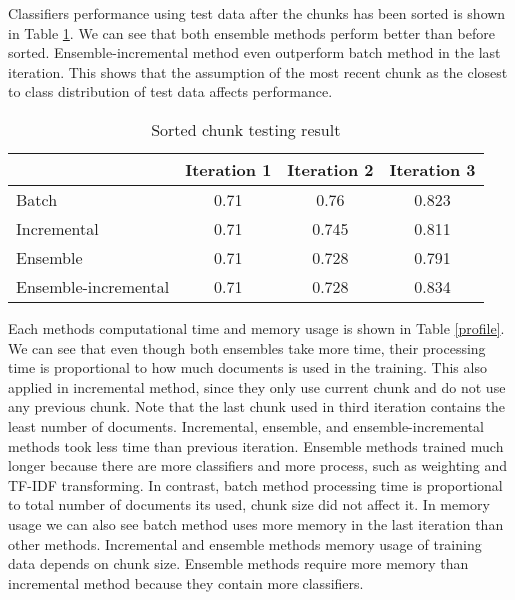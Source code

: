 \documentclass[conference]{IEEEtran}
\begin{document}
Classifiers performance using test data after the chunks has been sorted is shown in Table \ref{result_test_sorted}.
We can see that both ensemble methods perform better than before sorted.
Ensemble-incremental method even outperform batch method in the last iteration.
This shows that the assumption of the most recent chunk as the closest to class distribution of test data affects performance.

\begin{table}[!htb]
\renewcommand{\arraystretch}{1.3}
\caption{Sorted chunk testing result}
\label{result_test_sorted}
\centering
\begin{tabular}{|l|c|c|c|}
\hline
 & Iteration 1 & Iteration 2 & Iteration 3\\
\hline
Batch & 0.71 & 0.76 & 0.823\\
\hline
Incremental & 0.71 & 0.745 & 0.811\\
\hline
Ensemble & 0.71 & 0.728 & 0.791\\
\hline
Ensemble-incremental & 0.71 & 0.728 & 0.834\\
\hline
\end{tabular}
\end{table}

Each methods computational time and memory usage is shown in Table \ref{profile}.
We can see that even though both ensembles take more time, their processing time is proportional to how much documents is used in the training.
This also applied in incremental method, since they only use current chunk and do not use any previous chunk.
Note that the last chunk used in third iteration contains the least number of documents.
Incremental, ensemble, and ensemble-incremental methods took less time than previous iteration.
Ensemble methods trained much longer because there are more classifiers and more process, such as weighting and TF-IDF transforming.
In contrast, batch method processing time is proportional to total number of documents its used, chunk size did not affect it.
In memory usage we can also see batch method uses more memory in the last iteration than other methods.
Incremental and ensemble methods memory usage of training data depends on chunk size.
Ensemble methods require more memory than incremental method because they contain more classifiers.
\end{document}
